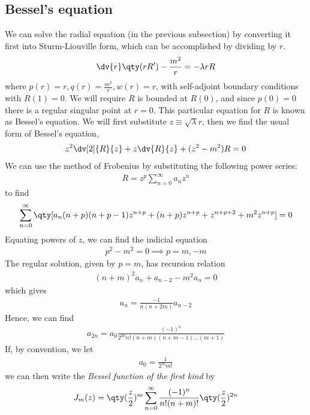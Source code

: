 \subsection{Bessel's equation}
We can solve the radial equation (in the previous subsection) by converting it first into Sturm-Liouville form, which can be accomplished by dividing by $r$.
\begin{align*}
	\dv{r} \qty(r R') - \frac{m^2}{r} = -\lambda r R
\end{align*}
where $p(r) = r, q(r) = \frac{m^2}{r}, w(r) = r$, with self-adjoint boundary conditions with $R(1) = 0$.
We will require $R$ is bounded at $R(0)$, and since $p(0) = 0$ there is a regular singular point at $r = 0$.
This particular equation for $R$ is known as Bessel's equation.
We will first substitute $z \equiv \sqrt{\lambda} r$, then we find the usual form of Bessel's equation,
\begin{align*}
	z^2 \dv[2]{R}{z} + z \dv{R}{z} + (z^2 - m^2)R = 0
\end{align*}
We can use the method of Frobenius by substituting the following power series:
\begin{align*}
	R = z^p \sum_{n=0}^\infty a_n z^n
\end{align*}
to find
\begin{align*}
	\sum_{n=0}^\infty \qty[ a_n (n+p)(n+p-1) z^{n+p} + (n+p) z^{n+p} + z^{n+p+2} + m^2 z^{n+p} ] = 0
\end{align*}
Equating powers of $z$, we can find the indicial equation
\begin{align*}
	p^2 - m^2 = 0 \implies p = m, -m
\end{align*}
The regular solution, given by $p = m$, has recursion relation
\begin{align*}
	(n+m)^2 a_n + a_{n-2} - m^2 a_n = 0
\end{align*}
which gives
\begin{align*}
	a_n = \frac{-1}{n(n+2m)} a_{n-2}
\end{align*}
Hence, we can find
\begin{align*}
	a_{2n} = a_0 \frac{(-1)^n}{2^{2n} n!
		(n+m)(n+m-1) \dots (m+1)}
\end{align*}
If, by convention, we let
\begin{align*}
	a_0 = \frac{1}{2^m m!}
\end{align*}
we can then write the \textit{Bessel function of the first kind} by
\begin{align*}
	J_m(z) = \qty(\frac{z}{2})^m \sum_{n=0}^\infty \frac{(-1)^n}{n!
		(n+m)!} \qty(\frac{z}{2})^{2n}
\end{align*}

